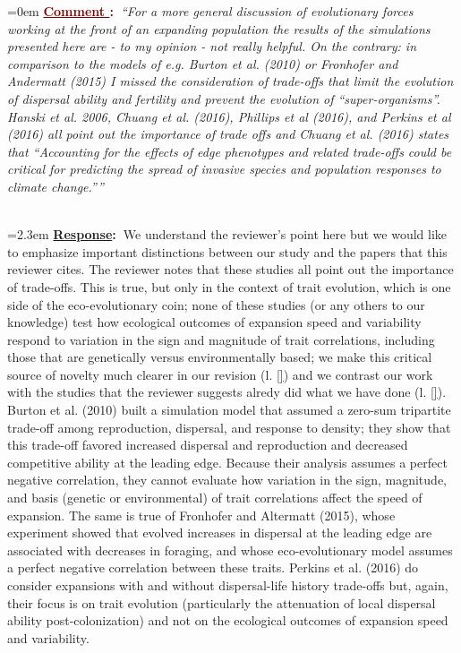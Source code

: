 \documentclass[12pt]{article}
\newcounter{cN}
\newcommand{\comment}[1]{
	\vspace{2em}
	\refstepcounter{cN} %
	\noindent \hangindent=0em \textbf{\textcolor{Maroon}{\uline{Comment \thecN}:~}}\emph{``#1''}
	}
\newcommand{\response}[1]{
	\\[0.25em]
	\hangindent=2.3em \textbf{\textcolor{NavyBlue}{\uline{Response}:~}}#1
	}
\begin{document}
\comment{For a more general discussion of evolutionary forces working at the front of an expanding population the results of the simulations presented here are - to my opinion - not really helpful.
On the contrary: in comparison to the models of e.g. Burton et al. (2010) or Fronhofer and Andermatt (2015) I missed the consideration of trade-offs that limit the evolution of dispersal ability and fertility and prevent the evolution of ``super-organisms''. Hanski et al. 2006, Chuang et al. (2016), Phillips et al (2016), and Perkins et al (2016) all point out the importance of trade offs and Chuang et al. (2016) states that ``Accounting for the effects of edge phenotypes and related trade-offs could be critical for predicting the spread of invasive species and population responses to climate change.''}
\response{We understand the reviewer's point here but we would like to emphasize important distinctions between our study and the papers that this reviewer cites.
The reviewer notes that these studies all point out the importance of trade-offs.
This is true, but only in the context of trait evolution, which is one side of the eco-evolutionary coin; none of these studies (or any others to our knowledge) test how ecological outcomes of expansion speed and variability respond to variation in the sign and magnitude of trait correlations, including those that are genetically versus environmentally based; we make this critical source of novelty much clearer in our revision (l. \ref{}) and we contrast our work with the studies that the reviewer suggests alredy did what we have done (l. \ref{}). 
Burton et al. (2010) built a simulation model that assumed a zero-sum tripartite trade-off among reproduction, dispersal, and response to density; they show that this trade-off favored increased dispersal and reproduction and decreased competitive ability at the leading edge.
Because their analysis assumes a perfect negative correlation, they cannot evaluate how variation in the sign, magnitude, and basis (genetic or environmental) of trait correlations affect the speed of expansion.
The same is true of Fronhofer and Altermatt (2015), whose experiment showed that evolved increases in dispersal at the leading edge are associated with decreases in foraging, and whose eco-evolutionary model assumes a perfect negative correlation between these traits. 
Perkins et al. (2016) do consider expansions with and without dispersal-life history trade-offs but, again, their focus is on trait evolution (particularly the attenuation of local dispersal ability post-colonization) and not on the ecological outcomes of expansion speed and variability.
}
\end{document}
